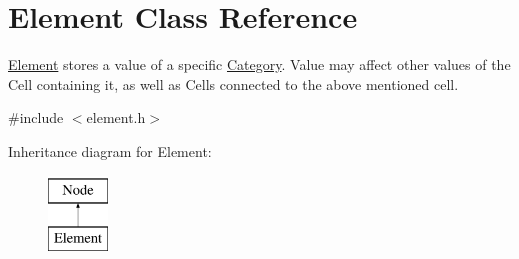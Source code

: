 \hypertarget{class_element}{\section{\-Element \-Class \-Reference}
\label{class_element}
}


\hyperlink{class_element}{\-Element} stores a value of a specific \hyperlink{class_category}{\-Category}. \-Value may affect other values of the \-Cell containing it, as well as \-Cells connected to the above mentioned cell.  




{\ttfamily \#include $<$element.\-h$>$}

\-Inheritance diagram for \-Element\-:\begin{figure}[H]
\begin{center}
\leavevmode
\includegraphics[height=2.000000cm]{class_element}
\end{center}
\end{figure}
